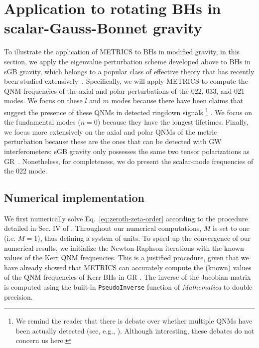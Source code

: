 \documentclass[aps,prx,amsmath,floats,floatfix,twocolumn,
  superscriptaddress,nofootinbib,showpacs]{revtex4-1}
\begin{document}
\section{Application to rotating BHs in scalar-Gauss-Bonnet gravity}
\label{sec:Application_sGB}

To illustrate the application of METRICS to BHs in modified gravity, in this section, we apply the eigenvalue perturbation scheme developed above to BHs in sGB gravity, which belongs to a popular class of effective theory that has recently been studied extensively~\cite{EdGB_01, EdGB_02, EdGB_03, EdGB_04, QNM_EdGB_01, QNM_EdGB_02, QNM_EdGB_03, PhysRevD.47.5259}.
Specifically, we will apply METRICS to compute the QNM frequencies of the axial and polar perturbations of the 022, 033, and 021 modes. 
We focus on these $l$ and $m$ modes because there have been claims that suggest the presence of these QNMs in detected ringdown signals \footnote{We remind the reader that there is debate over whether multiple QNMs have been actually detected (see, e.g., \cite{Cotesta:2022pci, Isi:2022mhy, Carullo:2023gtf}). Although interesting, these debates do not concern us here. 
} \cite{Siegel:2023lxl, Gennari:2023gmx}. 
We focus on the fundamental modes ($n=0$) because they have the longest lifetimes. 
Finally, we focus more extensively on the axial and polar QNMs of the metric perturbation because these are the ones that can be detected with GW interferometers; sGB gravity only possesses the same two tensor polarizations as GR~\cite{Wagle:2019mdq}. Nonetheless, for completeness, we do present the scalar-mode frequencies of the 022 mode. 

\subsection{Numerical implementation}

We first numerically solve Eq.~\eqref{eq:zeroth-zeta-order} according to the procedure detailed in Sec. IV of \cite{Chung:2023wkd}. 
Throughout our numerical computations, $M$ is set to one (i.e. $M=1$), thus defining a system of units. 
To speed up the convergence of our numerical results, we initialize the Newton-Raphson iterations with the known values of the Kerr QNM frequencies. 
This is a justified procedure, given that we have already showed that METRICS can accurately compute the (known) values of the QNM frequencies of Kerr BHs in GR \cite{Chung:2023wkd}. 
The inverse of the Jacobian matrix is computed using the built-in \texttt{PseudoInverse} function of \textit{Mathematica} to double precision. 
\end{document}
